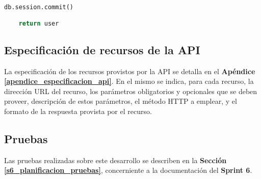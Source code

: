 \begin{enumerate}
\begin{lstlisting}[language=Python]
    db.session.commit()

    return user
\end{lstlisting}

\end{enumerate}

\subsection{Especificación de recursos de la API}

La especificación de los recursos provistos por la API se detalla en el \textbf{Apéndice \ref{apendice_especificacion_api}}.
En el mismo se indica, para cada recurso, la dirección URL del recurso, los parámetros obligatorios y opcionales que se deben proveer, descripción de estos parámetros, el método HTTP a emplear, y el formato de la respuesta provista por el recurso.

\subsection{Pruebas}

Las pruebas realizadas sobre este desarrollo se describen en la \textbf{Sección \ref{s6_planificacion_pruebas}}, concerniente a la documentación del \textbf{Sprint 6}.

